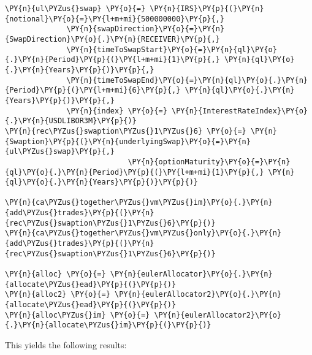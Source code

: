     \begin{tcolorbox}[breakable, size=fbox, boxrule=1pt, pad at break*=1mm,colback=cellbackground, colframe=cellborder]
\begin{Verbatim}[commandchars=\\\{\}]
\PY{n}{ul\PYZus{}swap} \PY{o}{=} \PY{n}{IRS}\PY{p}{(}\PY{n}{notional}\PY{o}{=}\PY{l+m+mi}{500000000}\PY{p}{,}
              \PY{n}{swapDirection}\PY{o}{=}\PY{n}{SwapDirection}\PY{o}{.}\PY{n}{RECEIVER}\PY{p}{,}
              \PY{n}{timeToSwapStart}\PY{o}{=}\PY{n}{ql}\PY{o}{.}\PY{n}{Period}\PY{p}{(}\PY{l+m+mi}{1}\PY{p}{,} \PY{n}{ql}\PY{o}{.}\PY{n}{Years}\PY{p}{)}\PY{p}{,}
              \PY{n}{timeToSwapEnd}\PY{o}{=}\PY{n}{ql}\PY{o}{.}\PY{n}{Period}\PY{p}{(}\PY{l+m+mi}{6}\PY{p}{,} \PY{n}{ql}\PY{o}{.}\PY{n}{Years}\PY{p}{)}\PY{p}{,}
              \PY{n}{index} \PY{o}{=} \PY{n}{InterestRateIndex}\PY{o}{.}\PY{n}{USDLIBOR3M}\PY{p}{)}
\PY{n}{rec\PYZus{}swaption\PYZus{}1\PYZus{}6} \PY{o}{=} \PY{n}{Swaption}\PY{p}{(}\PY{n}{underlyingSwap}\PY{o}{=}\PY{n}{ul\PYZus{}swap}\PY{p}{,}
                            \PY{n}{optionMaturity}\PY{o}{=}\PY{n}{ql}\PY{o}{.}\PY{n}{Period}\PY{p}{(}\PY{l+m+mi}{1}\PY{p}{,} \PY{n}{ql}\PY{o}{.}\PY{n}{Years}\PY{p}{)}\PY{p}{)}

\PY{n}{ca\PYZus{}together\PYZus{}vm\PYZus{}im}\PY{o}{.}\PY{n}{add\PYZus{}trades}\PY{p}{(}\PY{n}{rec\PYZus{}swaption\PYZus{}1\PYZus{}6}\PY{p}{)}
\PY{n}{ca\PYZus{}together\PYZus{}vm\PYZus{}only}\PY{o}{.}\PY{n}{add\PYZus{}trades}\PY{p}{(}\PY{n}{rec\PYZus{}swaption\PYZus{}1\PYZus{}6}\PY{p}{)}

\PY{n}{alloc} \PY{o}{=} \PY{n}{eulerAllocator}\PY{o}{.}\PY{n}{allocate\PYZus{}ead}\PY{p}{(}\PY{p}{)}
\PY{n}{alloc2} \PY{o}{=} \PY{n}{eulerAllocator2}\PY{o}{.}\PY{n}{allocate\PYZus{}ead}\PY{p}{(}\PY{p}{)}
\PY{n}{alloc\PYZus{}im} \PY{o}{=} \PY{n}{eulerAllocator2}\PY{o}{.}\PY{n}{allocate\PYZus{}im}\PY{p}{(}\PY{p}{)}
\end{Verbatim}
\end{tcolorbox}

    This yields the following results:

